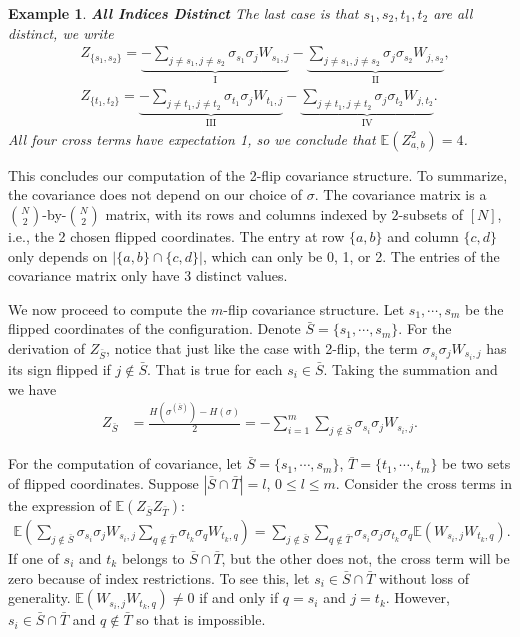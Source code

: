 \documentclass[10pt]{article}
\newcommand{\e}{\mathbb{E}}
\newtheorem{example}{\bf Example}
\newenvironment{Proof of lemma}{\noindent{\bf Proof of Lemma}}{\hfill$\Box$\newline}
\newenvironment{Proof of claim}{\noindent{\bf Proof of claim}}{\hfill$\Box$\newline}
\newenvironment{Proof of theorem}{\noindent{\bf Proof of Theorem}}{\hfill\scriptsize{$\Box$}\newline}
\newenvironment{Proof of theorems}{\noindent{\bf Proof of Theorems}}{\hfill$\Box$\newline}
\newenvironment{Proof of proposition}{\noindent{\bf Proof of Proposition}}{\hfill$\Box$\newline}
\newenvironment{Proof of propositions}{\noindent{\bf Proof of Propositions}}{\hfill$\Box$\newline}
\newenvironment{Proof of exercise}{\noindent{\it Proof of Exercise:}}{\hfill$\Box$}
\numberwithin{equation}{section}
\begin{document}
\begin{example}
    \textbf{All Indices Distinct}
    The last case is that $s_1,s_2,t_1,t_2$ are all distinct, we write
    \begin{align}
        &Z_{\{s_1,s_2\}} = \underbrace{- \sum_{j \neq s_1, j \neq s_2} \sigma_{s_1} \sigma_j W_{s_1,j}}_\text{I} - \underbrace{\sum_{j \neq s_1, j \neq s_2} \sigma_j \sigma_{s_2} W_{j,s_2}}_\text{II}, \\
        &Z_{\{t_1,t_2\}} = \underbrace{- \sum_{j \neq t_1, j \neq t_2} \sigma_{t_1} \sigma_j W_{t_1,j}}_\text{III} - \underbrace{\sum_{j \neq t_1, j \neq t_2} \sigma_j \sigma_{t_2} W_{j,t_2}}_\text{IV}.
    \end{align}
    All four cross terms have expectation 1, so we conclude that $\e(Z_{a,b}^2) = 4$.
\end{example}
This concludes our computation of the 2-flip covariance structure. To summarize, the covariance does not depend on our choice of $\sigma$. The covariance matrix is a $\binom{N}{2}$-by-$\binom{N}{2}$ matrix, with its rows and columns indexed by $2$-subsets of $[N]$, i.e., the 2 chosen flipped coordinates. The entry at row $\{a,b\}$ and column $\{c,d\}$ only depends on $|\{a,b\} \cap \{c,d\}|$, which can only be 0, 1, or 2. The entries of the covariance matrix only have 3 distinct values.

We now proceed to compute the $m$-flip covariance structure. Let $s_1, \cdots, s_m$ be the flipped coordinates of the configuration. Denote $\bar{S} = \{s_1, \cdots, s_m\}$. For the derivation of $Z_{\bar{S}}$, notice that just like the case with 2-flip, the term $\sigma_{s_i}\sigma_j W_{s_i,j}$ has its sign flipped if $j \notin \bar{S}$. That is true for each $s_i \in \bar{S}$. Taking the summation and we have
\begin{align} \label{general_z}
    Z_{\bar{S}} &= \frac{H(\sigma^{(\bar{S})})-H(\sigma)}{2} = -\sum_{i=1}^m \sum_{j \notin \bar{S}} \sigma_{s_i} \sigma_j W_{s_i,j}.
\end{align}

For the computation of covariance, let $\bar{S} = \{s_1, \cdots, s_m\}$, $\bar{T} = \{t_1, \cdots, t_m\}$ be two sets of flipped coordinates. Suppose $|\bar{S} \cap \bar{T}| = l$, $0 \leq l \leq m$. Consider the cross terms in the expression of $\e(Z_{\bar{S}}Z_{\bar{T}})$:
\begin{align} \label{general_z_cross_term}
    \e \left(\sum_{j \notin \bar{S}} \sigma_{s_i} \sigma_j W_{s_i,j} \sum_{q \notin \bar{T}} \sigma_{t_k} \sigma_q W_{t_k,q} \right) = \sum_{j \notin \bar{S}}\sum_{q \notin \bar{T}} \sigma_{s_i} \sigma_j \sigma_{t_k} \sigma_q \e(W_{s_i,j} W_{t_k,q}).
\end{align}
If one of $s_i$ and $t_k$ belongs to $\bar{S} \cap \bar{T}$, but the other does not, the cross term will be zero because of index restrictions. To see this, let $s_i \in \bar{S} \cap \bar{T}$ without loss of generality. $\e(W_{s_i,j} W_{t_k,q}) \neq 0$ if and only if $q = s_i$ and $j = t_k$. However, $s_i \in \bar{S} \cap \bar{T}$ and $q \notin \bar{T}$ so that is impossible.
\end{document}
